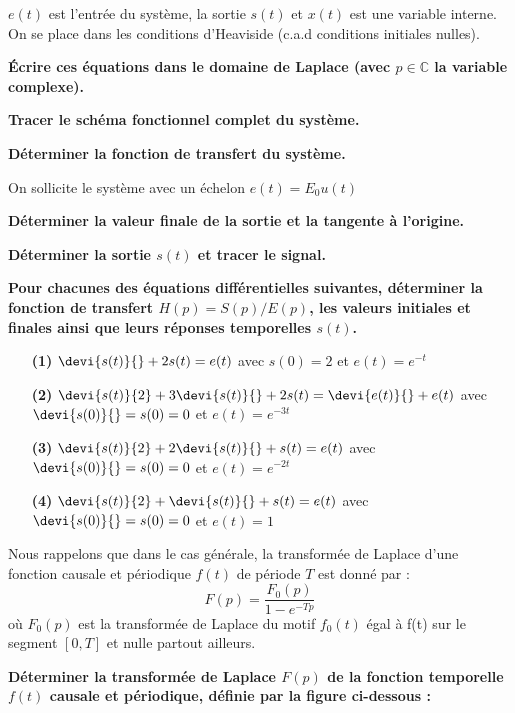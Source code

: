 $e(t)$ est l'entrée du système, la sortie $s(t)$ et $x(t)$ est une variable interne.
On se place dans les conditions d'Heaviside (c.a.d conditions initiales nulles).\newline

\question{}
\textbf{\'Ecrire ces équations dans le domaine de Laplace (avec $p\in\mathbb{C}$ la variable complexe).}

\question{}
\textbf{Tracer le schéma fonctionnel complet du système.}

\question{}
\textbf{Déterminer la fonction de transfert du système.}\newline

On sollicite le système avec un échelon $e(t)=E_0 u(t)$

\question{}
\textbf{Déterminer la valeur finale de la sortie et la tangente à l'origine.}

\question{}
\textbf{Déterminer la sortie $s(t)$ et tracer le signal.}


\question{}
\textbf{Pour chacunes des équations différentielles suivantes, 
déterminer la fonction de transfert $H(p) = S(p)/E(p)$, les valeurs initiales et finales ainsi que 
leurs réponses temporelles $s(t)$.}

\begin{itemize}
\item[\textbf{(1)}] $\devi{s(t)}{} + 2s(t) = e(t) $ avec $s(0)=2$ et $e(t) = e^{-t}$
\item[\textbf{(2)}] $\devi{s(t)}{2} + 3 \devi{s(t)}{} + 2s(t) = \devi{e(t)}{} + e(t)$ avec $\devi{s(0)}{}=s(0)=0$ et $e(t) = e^{-3t}$
\item[\textbf{(3)}] $\devi{s(t)}{2} + 2\devi{s(t)}{} + s(t)  = e(t)$ avec $\devi{s(0)}{}=s(0)=0$ et $e(t) = e^{-2t}$
\item[\textbf{(4)}] $\devi{s(t)}{2} + \devi{s(t)}{} + s(t) = e(t)$ avec $\devi{s(0)}{}=s(0)=0$ et $e(t) = 1$
\end{itemize}


Nous rappelons que dans le cas générale, 
la transformée de Laplace d'une fonction causale et périodique $f(t)$ de période $T$ est donné par :
$$
F(p) = \dfrac{F_0(p)}{1-e^{-Tp}}
$$
où $F_0(p)$ est la transformée de Laplace du motif $f_0(t)$ égal à f(t) sur le segment $[0,T]$ et nulle
partout ailleurs.

\question{}
\textbf{Déterminer la transformée de Laplace $F(p)$ de la fonction 
        temporelle $f(t)$ causale et périodique, définie par la figure 
        ci-dessous :}

